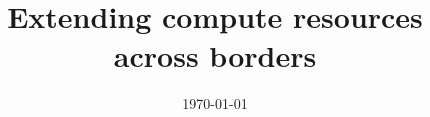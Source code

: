 \documentclass[%
a4paper,journal]{settings/IEEEtran}
\title{Extending compute resources across borders}
\date{\today}
\begin{document}

\maketitle





\nocite{*} %



\end{document}
